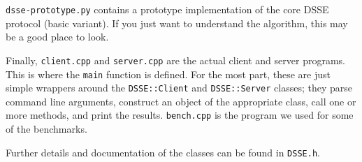 \texttt{dsse-prototype.py} contains a prototype implementation of the core DSSE protocol (basic variant).
If you just want to understand the algorithm, this may be a good place to look.

Finally, \texttt{client.cpp} and \texttt{server.cpp} are the
actual client and server programs. This is where the \texttt{main} function is
defined.
For the most part, these are just simple wrappers around the
\texttt{DSSE::Client} and \texttt{DSSE::Server} classes;
they parse command line arguments, construct an object of the appropriate class,
call one or more methods, and print the results.
\texttt{bench.cpp} is the program we used for some of the benchmarks.

Further details and documentation of the classes can be found in \texttt{DSSE.h}.
